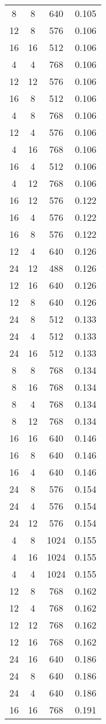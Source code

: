 \begin{table}[tp]
\begin{tabular}{cccc}
8 & 8 & 640 & 0.105\\
12 & 8 & 576 & 0.106\\
16 & 16 & 512 & 0.106\\
4 & 4 & 768 & 0.106\\
12 & 12 & 576 & 0.106\\
16 & 8 & 512 & 0.106\\
4 & 8 & 768 & 0.106\\
12 & 4 & 576 & 0.106\\
4 & 16 & 768 & 0.106\\
16 & 4 & 512 & 0.106\\
4 & 12 & 768 & 0.106\\
16 & 12 & 576 & 0.122\\
16 & 4 & 576 & 0.122\\
16 & 8 & 576 & 0.122\\
12 & 4 & 640 & 0.126\\
24 & 12 & 488 & 0.126\\
12 & 16 & 640 & 0.126\\
12 & 8 & 640 & 0.126\\
24 & 8 & 512 & 0.133\\
24 & 4 & 512 & 0.133\\
24 & 16 & 512 & 0.133\\
8 & 8 & 768 & 0.134\\
8 & 16 & 768 & 0.134\\
8 & 4 & 768 & 0.134\\
8 & 12 & 768 & 0.134\\
16 & 16 & 640 & 0.146\\
16 & 8 & 640 & 0.146\\
16 & 4 & 640 & 0.146\\
24 & 8 & 576 & 0.154\\
24 & 4 & 576 & 0.154\\
24 & 12 & 576 & 0.154\\
4 & 8 & 1024 & 0.155\\
4 & 16 & 1024 & 0.155\\
4 & 4 & 1024 & 0.155\\
12 & 8 & 768 & 0.162\\
12 & 4 & 768 & 0.162\\
12 & 12 & 768 & 0.162\\
12 & 16 & 768 & 0.162\\
24 & 16 & 640 & 0.186\\
24 & 8 & 640 & 0.186\\
24 & 4 & 640 & 0.186\\
16 & 16 & 768 & 0.191\\

\end{tabular}
\end{table}

